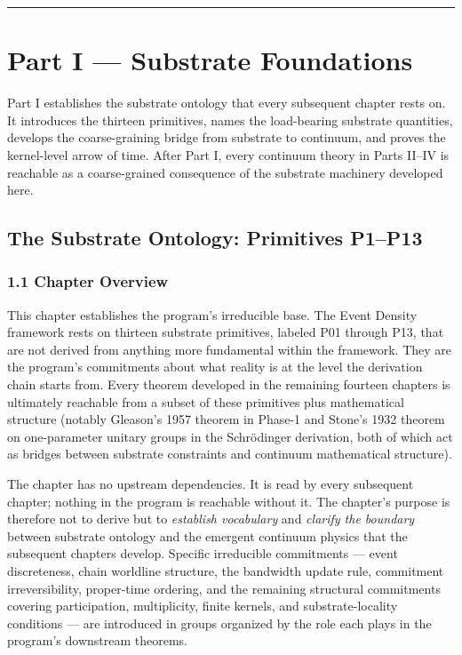 \documentclass[11pt]{book}
\begin{document}
\bigskip\hrule\bigskip


\part{Part I — Substrate Foundations}

Part I establishes the substrate ontology that every subsequent chapter rests on. It introduces the thirteen primitives, names the load-bearing substrate quantities, develops the coarse-graining bridge from substrate to continuum, and proves the kernel-level arrow of time. After Part I, every continuum theory in Parts II–IV is reachable as a coarse-grained consequence of the substrate machinery developed here.

\newpage


\chapter{The Substrate Ontology: Primitives P1–P13}
\label{chap:1}

\section{1.1 Chapter Overview}

This chapter establishes the program's irreducible base. The Event Density framework rests on thirteen substrate primitives, labeled P01 through P13, that are not derived from anything more fundamental within the framework. They are the program's commitments about what reality is at the level the derivation chain starts from. Every theorem developed in the remaining fourteen chapters is ultimately reachable from a subset of these primitives plus mathematical structure (notably Gleason's 1957 theorem in Phase-1 and Stone's 1932 theorem on one-parameter unitary groups in the Schrödinger derivation, both of which act as bridges between substrate constraints and continuum mathematical structure).

The chapter has no upstream dependencies. It is read by every subsequent chapter; nothing in the program is reachable without it. The chapter's purpose is therefore not to derive but to \textit{establish vocabulary} and \textit{clarify the boundary} between substrate ontology and the emergent continuum physics that the subsequent chapters develop. Specific irreducible commitments — event discreteness, chain worldline structure, the bandwidth update rule, commitment irreversibility, proper-time ordering, and the remaining structural commitments covering participation, multiplicity, finite kernels, and substrate-locality conditions — are introduced in groups organized by the role each plays in the program's downstream theorems.
\end{document}
